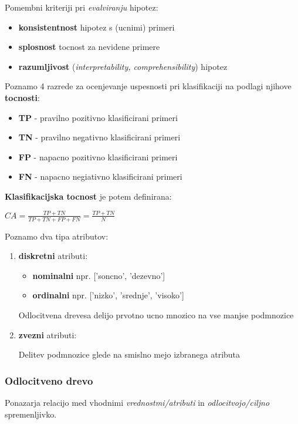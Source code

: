 \documentclass{article}
\begin{document}
\begin{multicols}{2}
	Pomembni kriteriji pri \textit{evalviranju} hipotez:
	\begin{itemize}
		\item \textbf{konsistentnost} hipotez s (ucnimi) primeri
		\item \textbf{splosnost} tocnost za nevidene primere
		\item \textbf{razumljivost} (\textit{interpretability, comprehensibility}) hipotez
	\end{itemize}

	Poznamo 4 razrede za ocenjevanje uspesnosti pri klasifikaciji na podlagi njihove \textbf{tocnosti}:
	\begin{itemize}
		\item \textbf{TP} - pravilno pozitivno klasificirani primeri
		\item \textbf{TN} - pravilno negativno klasificirani primeri
		\item \textbf{FP} - napacno pozitivno klasificirani primeri
		\item \textbf{FN} - napacno negiativno klasificirani primeri
	\end{itemize}

	\textbf{Klasifikacijska tocnost} je potem definirana:

	\begin{center}
		\begin{math}
			CA = \frac{TP + TN}{TP + TN + FP + FN} = \frac{TP + TN}{N}
		\end{math}
	\end{center}

	Poznamo dva tipa atributov:

	\begin{enumerate}
		\item \textbf{diskretni} atributi:
		      \begin{itemize}
			      \item  \textbf{nominalni} npr. ['soncno', 'dezevno']
			      \item  \textbf{ordinalni} npr. ['nizko', 'srednje', 'visoko']
		      \end{itemize}
		      Odlocitvena drevesa delijo prvotno ucno mnozico na vse manjse podmnozice
		\item \textbf{zvezni} atributi:

		      Delitev podmnozice glede na smislno mejo izbranega atributa
	\end{enumerate}

	\subsubsection{Odlocitveno drevo}
	Ponazarja relacijo med vhodnimi \textit{vrednostmi/atributi} in \textit{odlocitvojo/ciljno} spremenljivko.


\end{multicols}
\end{document}
